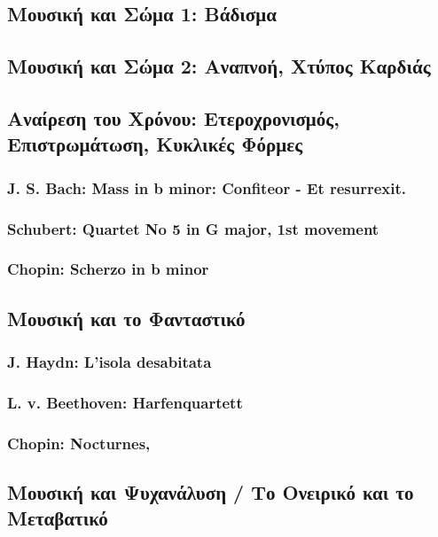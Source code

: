 \subsection{Μουσική και Σώμα 1: Βάδισμα}
\label{sec:org14a9079}
\subsection{Μουσική και Σώμα 2: Αναπνοή, Χτύπος Καρδιάς}
\label{sec:org1a2379f}
\subsection{Αναίρεση του Χρόνου: Ετεροχρονισμός, Επιστρωμάτωση, Κυκλικές Φόρμες}
\label{sec:org4528e11}
\subsubsection{J. S. Bach: Mass in b minor: Confiteor - Et resurrexit.}
\label{sec:org50203a1}
\subsubsection{Schubert: Quartet No 5 in G major, 1st movement}
\label{sec:orgfd867c6}
\subsubsection{Chopin: Scherzo in b minor}
\label{sec:org0b0f7d9}
\subsection{Μουσική και το Φανταστικό}
\label{sec:org7867434}
\subsubsection{J. Haydn: L'isola desabitata}
\label{sec:org783a300}
\subsubsection{L. v. Beethoven: Harfenquartett}
\label{sec:orgdfe669e}

\subsubsection{Chopin: Nocturnes,}
\label{sec:org173b6d5}
\subsection{Μουσική και Ψυχανάλυση / Το Ονειρικό και το Μεταβατικό}
\label{sec:orgda7dae6}
